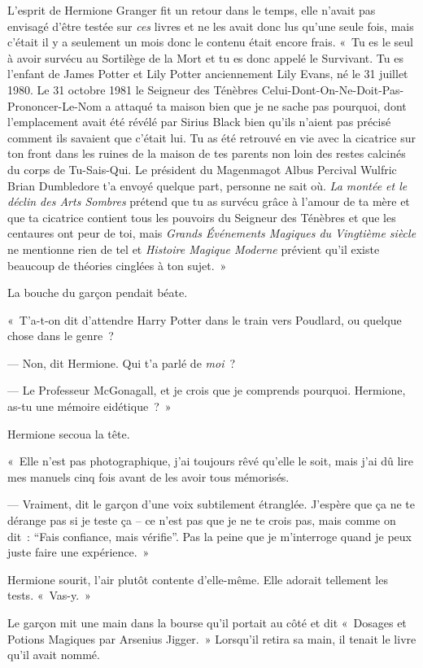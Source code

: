 L'esprit de Hermione Granger fit un retour dans le temps, elle n'avait pas envisagé d'être testée sur \emph{ces} livres et ne les avait donc lus qu'une seule fois, mais c'était il y a seulement un mois donc le contenu était encore frais. «~Tu es le seul à avoir survécu au Sortilège de la Mort et tu es donc appelé le Survivant. Tu es l'enfant de James Potter et Lily Potter anciennement Lily Evans, né le 31 juillet 1980. Le 31 octobre 1981 le Seigneur des Ténèbres Celui-Dont-On-Ne-Doit-Pas-Prononcer-Le-Nom a attaqué ta maison bien que je ne sache pas pourquoi, dont l'emplacement avait été révélé par Sirius Black bien qu'ils n'aient pas précisé comment ils savaient que c'était lui. Tu as été retrouvé en vie avec la cicatrice sur ton front dans les ruines de la maison de tes parents non loin des restes calcinés du corps de Tu-Sais-Qui. Le président du Magenmagot Albus Percival Wulfric Brian Dumbledore t'a envoyé quelque part, personne ne sait où. \emph{La montée et le déclin des Arts Sombres} prétend que tu as survécu grâce à l'amour de ta mère et que ta cicatrice contient tous les pouvoirs du Seigneur des Ténèbres et que les centaures ont peur de toi, mais \emph{Grands Événements Magiques du Vingtième siècle} ne mentionne rien de tel et \emph{Histoire Magique Moderne} prévient qu'il existe beaucoup de théories cinglées à ton sujet.~»

La bouche du garçon pendait béate.

«~T'a-t-on dit d'attendre Harry Potter dans le train vers Poudlard, ou quelque chose dans le genre~?

--- Non, dit Hermione. Qui t'a parlé de \emph{moi}~?

--- Le Professeur McGonagall, et je crois que je comprends pourquoi. Hermione, as-tu une mémoire eidétique~?~»

Hermione secoua la tête.

«~Elle n'est pas photographique, j'ai toujours rêvé qu'elle le soit, mais j'ai dû lire mes manuels cinq fois avant de les avoir tous mémorisés.

--- Vraiment, dit le garçon d'une voix subtilement étranglée. J'espère que ça ne te dérange pas si je teste ça -- ce n'est pas que je ne te crois pas, mais comme on dit~: “Fais confiance, mais vérifie”. Pas la peine que je m'interroge quand je peux juste faire une expérience.~»

Hermione sourit, l'air plutôt contente d'elle-même. Elle adorait tellement les tests. «~Vas-y.~»

Le garçon mit une main dans la bourse qu'il portait au côté et dit «~Dosages et Potions Magiques par Arsenius Jigger.~» Lorsqu'il retira sa main, il tenait le livre qu'il avait nommé.

